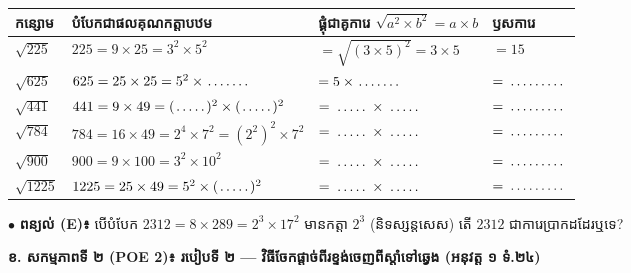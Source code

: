 \documentclass[a4paper,10pt]{article}
\newcommand{\en}[1]{{\TimesEn #1}}
\newcommand{\blank}[1][1.5cm]{\makebox[#1]{\dotfill}}
\begin{document}
{\renewcommand{\arraystretch}{1.48}
\begin{tabular}{|C{2.45cm}|L{6.45cm}|L{5.35cm}|C{3.35cm}|}
  \hline
  \textbf{កន្សោម} & \textbf{បំបែកជាផលគុណកត្តាបឋម} & \textbf{ផ្គុំជាគូការេ $\sqrt{a^2\times b^2} = a\times b$} & \textbf{ឫសការេ} \\
  \hline
  $\sqrt{225}$ & $225 = 9\times 25 = 3^2 \times 5^2$ & $= \sqrt{(3\times 5)^2} = 3\times 5$ & $= 15$ \\
  \hline
  $\sqrt{625}$ & $625 = 25\times 25 = 5^2 \times \blank[1.1cm]$ & $= 5 \times \blank[1.1cm]$ & $= \blank[1.5cm]$ \\
  \hline
  $\sqrt{441}$ & $441 = 9\times 49 = (\blank[0.8cm])^2 \times (\blank[0.8cm])^2$ & $= \blank[0.9cm] \times \blank[0.9cm]$ & $= \blank[1.5cm]$ \\
  \hline
  $\sqrt{784}$ & $784 = 16\times 49 = 2^4 \times 7^2 = (2^2)^2 \times 7^2$ & $= \blank[0.9cm] \times \blank[0.9cm]$ & $= \blank[1.5cm]$ \\
  \hline
  $\sqrt{900}$ & $900 = 9\times 100 = 3^2 \times 10^2$ & $= \blank[0.9cm] \times \blank[0.9cm]$ & $= \blank[1.5cm]$ \\
  \hline
  $\sqrt{1225}$ & $1225 = 25\times 49 = 5^2 \times (\blank[0.8cm])^2$ & $= \blank[0.9cm] \times \blank[0.9cm]$ & $= \blank[1.5cm]$ \\
  \hline
\end{tabular}}

\vspace{3pt}
$\bullet$ \textbf{ពន្យល់ (\en{E})៖} បើបំបែក $2312 = 8\times 289 = 2^3 \times 17^2$ មានកត្តា $2^3$ (និទស្សន្តសេស) តើ $2312$ ជាការេប្រាកដដែរឬទេ? \blank[2.1cm]

\vspace{4pt}
\textbf{ខ. សកម្មភាពទី ២ (\en{POE 2})៖ របៀបទី ២ — វិធីចែកផ្ដាច់ពីរខ្ទង់ចេញពីស្ដាំទៅឆ្វេង (អនុវត្ត ១ ទំ.២៤)}
\end{document}
